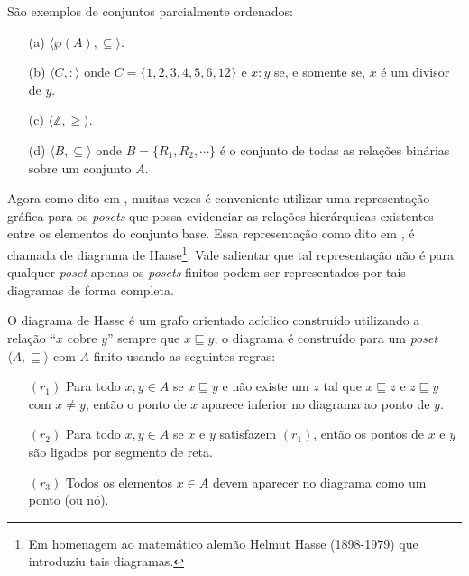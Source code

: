 \begin{example}
	São exemplos de conjuntos parcialmente ordenados:
	\begin{itemize}
		\item[(a)] $\langle \wp(A), \subseteq \rangle$.
		\item[(b)] $\langle C,  : \rangle$ onde $C = \{1, 2, 3, 4, 5, 6, 12\}$ e $x : y$ se, e somente se, $x$ é um divisor de $y$.
		\item[(c)] $\langle \mathbb{Z}, \geq \rangle$.
		\item[(d)] $\langle B, \subseteq \rangle$ onde $B = \{R_1, R_2, \cdots\}$ é o conjunto de todas as relações binárias sobre um conjunto $A$.
	\end{itemize}
\end{example}

Agora como dito em \cite{morgado1962poset}, muitas vezes é conveniente utilizar uma representação gráfica para os \textit{posets} que possa evidenciar as relações hierárquicas existentes entre os elementos do conjunto base. Essa representação como dito em \cite{abe1991-TC}, é chamada de diagrama de Haase\footnote{Em homenagem ao matemático alemão Helmut Hasse (1898-1979) que introduziu tais diagramas.}. Vale salientar que tal representação não é para qualquer \textit{poset} apenas os \textit{posets} finitos podem ser representados por tais diagramas de forma completa.

O diagrama de Hasse é um grafo orientado acíclico construído utilizando a relação ``$x$ cobre $y$'' sempre que $x \sqsubseteq y$, o diagrama é construído para um \textit{poset} $\langle A, \sqsubseteq \rangle$ com $A$ finito usando as seguintes regras:

\begin{itemize}
	\item[$(r_1)$] Para todo $x, y \in A$ se $x \sqsubseteq  y$ e não existe um $z$ tal que $x \sqsubseteq  z$ e $z \sqsubseteq  y$ com $x \neq y$, então o ponto de $x$ aparece inferior no diagrama ao ponto de $y$.
	\item[$(r_2)$] Para todo $x, y \in A$ se $x$ e $y$ satisfazem $(r_1)$, então os pontos de $x$ e $y$ são ligados por segmento de reta.
	\item[$(r_3)$] Todos os elementos $x \in A$ devem aparecer no diagrama como um ponto (ou nó).
\end{itemize}

